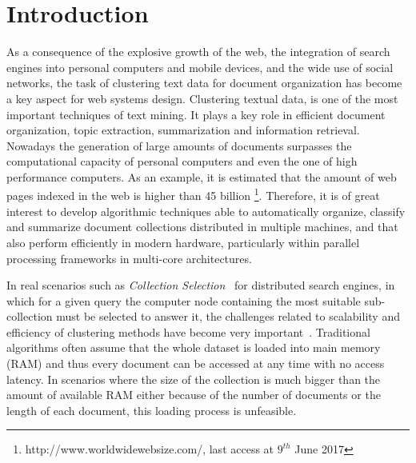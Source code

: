 \documentclass[smallextended]{svjour3}       %
\begin{document}
\section{Introduction}
As a consequence of the explosive growth of the web, the integration of search engines into personal computers and mobile devices, and the wide use of social networks, the task of clustering text data for document organization has become a key aspect for web systems design. Clustering textual data, is one of the most important techniques of text mining. It plays a key role in efficient document organization, topic extraction, summarization and information retrieval. Nowadays the generation of large amounts of documents surpasses the computational capacity of personal computers and even the one of high performance computers. 
As an example, it is estimated that the amount of web pages indexed in the web is higher than 45 billion \footnote{http://www.worldwidewebsize.com/, last access at $9^{th}$ June 2017}.
Therefore, it is of great interest to develop algorithmic techniques able to automatically organize, classify and summarize document collections distributed in multiple machines, and that also perform efficiently in modern hardware, particularly within parallel processing frameworks in multi-core architectures. 

In real scenarios such as \textit{Collection Selection}~\cite{CM13} for distributed search engines, in which for a given query the computer node containing the most suitable sub-collection must be selected to answer it, 
the challenges related to scalability and efficiency of clustering methods have become very important~\cite{Mendoza16}. Traditional algorithms often assume that the whole dataset is loaded into main memory (RAM) and thus every document can be accessed at any time with no access latency. In scenarios where the size of the collection is much bigger than the amount of available RAM either because of the number of documents or the length of each document, this loading process is unfeasible.
\end{document}
